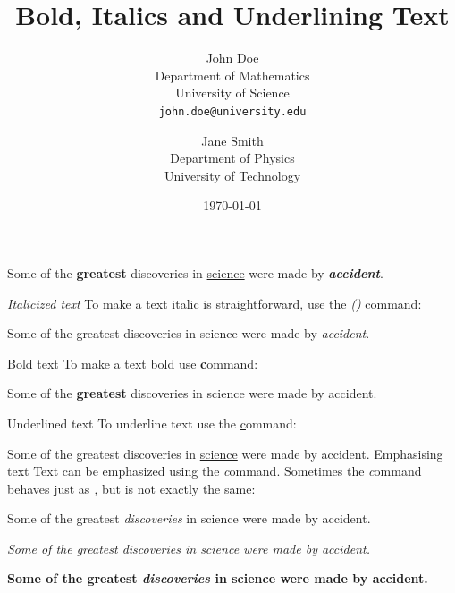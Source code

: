 \documentclass{article}
\title{\Large Bold, Italics and Underlining Text}
\author{
	John Doe \\
	Department of Mathematics \\
	University of Science \\
	\texttt{john.doe@university.edu}
	\and
	Jane Smith \\
	Department of Physics \\
	University of Technology
}
\date{\today}
\begin{document}
	
	\maketitle
	
	Some of the \textbf{greatest} 
	discoveries in \underline{science} 
	were made by \textbf{\textit{accident}}.
	
	\textit{Italicized text}
	To make a text italic is straightforward, use the \textit (\emph) command:
	
	Some of the greatest 
	discoveries in science 
	were made by \textit{accident}.
	
	Bold text
	To make a text bold use \textbf command:
	
	Some of the \textbf{greatest} 
	discoveries in science 
	were made by accident.
	
	Underlined text
	To underline text use the \underline command:
	
	Some of the greatest 
	discoveries in \underline{science} 
	were made by accident.
	Emphasising text
	Text can be emphasized using the \emph command. Sometimes the \emph command behaves just as \textit, but is not exactly the same:
	
	Some of the greatest \emph{discoveries} 
	in science 
	were made by accident.
	
	\textit{Some of the greatest \emph{discoveries} 
		in science 
		were made by accident.}
	
	\textbf{Some of the greatest \emph{discoveries} 
		in science 
		were made by accident.}
	
\end{document}
